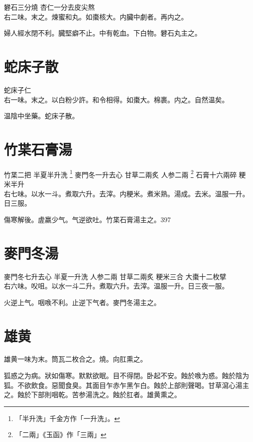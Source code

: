 礬石{\scriptsize 三分燒} 杏仁{\scriptsize 一分去皮尖熬}\\
右二味。末之。煉蜜和丸。如棗核大。内臟中劇者。再内之。

婦人經水閉不利。臓堅癖不止。中有乾血。下白物。礬石丸主之。

\section{蛇床子散}

蛇床子仁\\
右一味。末之。以白粉少許。和令相得。如棗大。棉裹。内之。自然温矣。

温陰中坐藥。蛇床子散。

\section{竹枼石膏湯}

竹枼{\scriptsize 二把} 半夏{\scriptsize 半升洗
	\footnote{
		「半升洗」千金方作「一升洗」。
	}
} 麥門冬{\scriptsize 一升去心} 甘草{\scriptsize 二兩炙} 人参{\scriptsize 二兩
	\footnote{
		「二兩」《玉函》作「三兩」
	}
} 石膏{\scriptsize 十六兩碎} 粳米{\scriptsize 半升}\\
右七味。以水一斗。煮取六升。去滓。内粳米。煮米熟。湯成。去米。温服一升。日三服。

傷寒解後。虗羸少气。气逆欲吐。竹枼石膏湯主之。397

\section{麥門冬湯}

麥門冬{\scriptsize 七升去心} 半夏{\scriptsize 一升洗} 人参{\scriptsize 二兩} 甘草{\scriptsize 二兩炙} 粳米{\scriptsize 三合} 大棗{\scriptsize 十二枚擘}\\
右六味。㕮咀。以水一斗二升。煮取六升。去滓。温服一升。日三夜一服。

火逆上气。咽㗋不利。止逆下气者。麥門冬湯主之。

\section{雄黄}

雄黄一味为末。筒瓦二枚合之。燒。向肛熏之。

狐惑之为病。狀如傷寒。默默欲眠。目不得閉。卧起不安。蝕於㗋为惑。蝕於陰为狐。不欲飲食。惡聞食臭。其面目乍赤乍黑乍白。蝕於上部則聲喝。甘草瀉心湯主之。蝕於下部則咽乾。苦参湯洗之。蝕於肛者。雄黄熏之。

